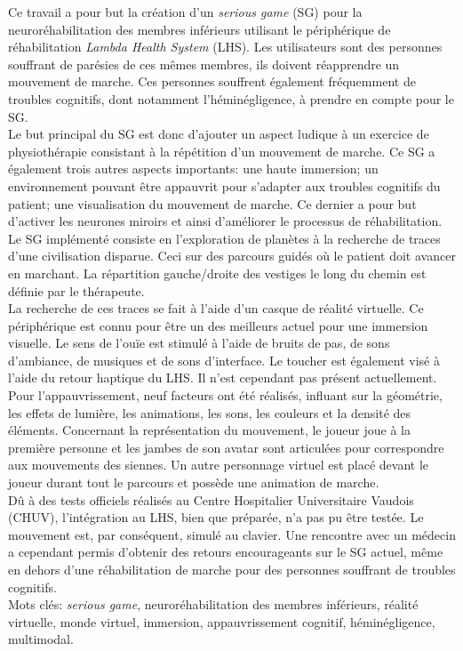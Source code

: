 Ce travail a pour but la création d'un \textit{serious game} (SG) pour la neuroréhabilitation des membres inférieurs utilisant le périphérique de réhabilitation \textit{Lambda Health System} (LHS). Les utilisateurs sont des personnes souffrant de parésies de ces mêmes membres, ils doivent réapprendre un mouvement de marche. Ces personnes souffrent également fréquemment de troubles cognitifs, dont notamment l'héminégligence, à prendre en compte pour le SG.
\\

Le but principal du SG est donc d'ajouter un aspect ludique à un exercice de physiothérapie consistant à la répétition d'un mouvement de marche. Ce SG a également trois autres aspects importants: une haute immersion; un environnement pouvant être appauvrit pour s'adapter aux troubles cognitifs du patient; une visualisation du mouvement de marche. Ce dernier a pour but d'activer les neurones miroirs et ainsi d'améliorer le processus de réhabilitation.
\\
 
Le SG implémenté consiste en l'exploration de planètes à la recherche de traces d'une civilisation disparue. Ceci sur des parcours guidés où le patient doit avancer en marchant. La répartition gauche/droite des vestiges le long du chemin est définie par le thérapeute.
\\

La recherche de ces traces se fait à l'aide d'un casque de réalité virtuelle. Ce périphérique est connu pour être un des meilleurs actuel pour une immersion visuelle. Le sens de l'ouïe est stimulé à l'aide de bruits de pas, de sons d'ambiance, de musiques et de sons d'interface. Le toucher est également visé à l'aide du retour haptique du LHS. Il n'est cependant pas présent actuellement. Pour l'appauvrissement, neuf facteurs ont été réalisés, influant sur la géométrie, les effets de lumière, les animations, les sons, les couleurs et la densité des éléments. Concernant la représentation du mouvement, le joueur joue à la première personne et les jambes de son avatar sont articulées pour correspondre aux mouvements des siennes. Un autre personnage virtuel est placé devant le joueur durant tout le parcours et possède une animation de marche.
\\

Dû à des tests officiels réalisés au Centre Hospitalier Universitaire Vaudois (CHUV), l'intégration au LHS, bien que préparée, n'a pas pu être testée. Le mouvement est, par conséquent, simulé au clavier. Une rencontre avec un médecin a cependant permis d'obtenir des retours encourageants sur le SG actuel, même en dehors d'une réhabilitation de marche pour des personnes souffrant de troubles cognitifs.
\\

Mots clés: \textit{serious game}, neuroréhabilitation des membres inférieurs, réalité virtuelle, monde virtuel, immersion, appauvrissement cognitif, héminégligence, multimodal.

